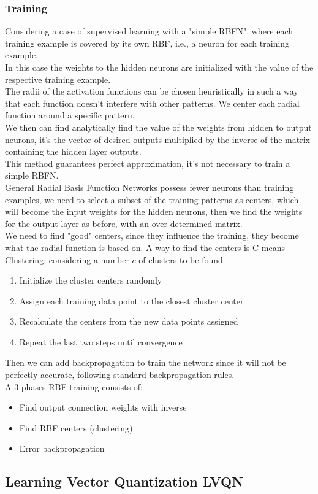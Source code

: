 \documentclass{article}
\begin{document}
	\subsubsection{Training}
	Considering a case of supervised learning with a "simple RBFN", where each training example is covered by its own RBF, i.e., a neuron for each training example. \\
	In this case the weights to the hidden neurons are initialized with the value of the respective training example. \\
	The radii of the activation functions can be chosen heuristically in such a way that each function doesn't interfere with other patterns. We center each radial function around a specific pattern.\\
	We then can find analytically find the value of the weights from hidden to output neurons, it's the vector of desired outputs multiplied by the inverse of the matrix containing the hidden layer outputs.\\
	This method guarantees perfect approximation, it's not necessary to train a simple RBFN.\\
	
	General Radial Basis Function Networks possess fewer neurons than training examples, we need to select a subset of the training patterns as centers, which will become the input weights for the hidden neurons, then we find the weights for the output layer as before, with an over-determined matrix.\\
	
	We need to find "good" centers, since they influence the training, they become what the radial function is based on. A way to find the centers is C-means Clustering: considering  a number $c$ of clusters to be found
	\begin{enumerate}
		\item Initialize the cluster centers randomly
		\item Assign each training data point to the closest cluster center
		\item Recalculate the centers from the new data points assigned 
		\item Repeat the last two steps until convergence
	\end{enumerate}
	
	Then we can add backpropagation to train the network since it will not be perfectly accurate, following standard backpropagation rules. \\
	
	A 3-phases RBF training consists of: 
	\begin{itemize}
		\item Find output connection weights with inverse
		\item Find RBF centers (clustering)
		\item Error backpropagation
	\end{itemize}
	
	\subsection{Learning Vector Quantization LVQN}
	
\end{document}
